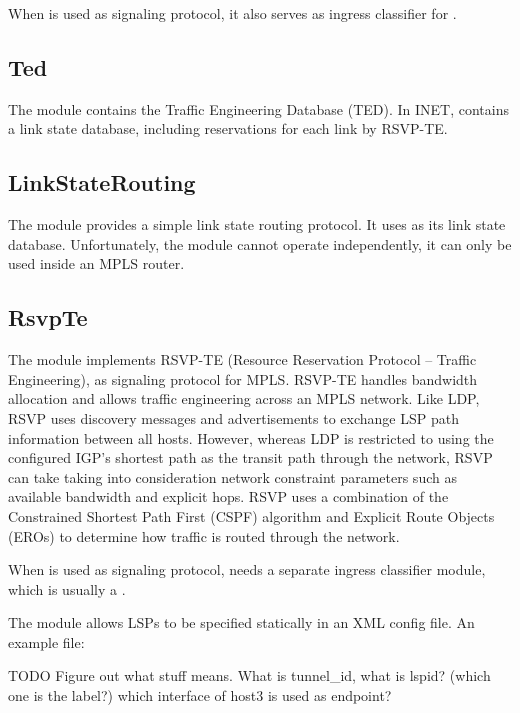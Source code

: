 When  is used as signaling protocol, it also serves as ingress
classifier for .

\subsection{Ted}
\label{sec:mpls:ted}

The  module contains the Traffic Engineering Database (TED).
In INET,  contains a link state database, including reservations
for each link by RSVP-TE.

\subsection{LinkStateRouting}
\label{sec:mpls:linkstaterouting}

The  module provides a simple link state routing
protocol. It uses  as its link state database. Unfortunately, the
 module cannot operate independently, it can only be
used inside an MPLS router.

 \subsection{RsvpTe}
\label{sec:mpls:rsvpte}

The  module implements RSVP-TE (Resource Reservation Protocol --
Traffic Engineering), as signaling protocol for MPLS. RSVP-TE handles bandwidth
allocation and allows traffic engineering across an MPLS network. Like LDP, RSVP
uses discovery messages and advertisements to exchange LSP path information
between all hosts. However, whereas LDP is restricted to using the configured
IGP's shortest path as the transit path through the network, RSVP can take
taking into consideration network constraint parameters such as available
bandwidth and explicit hops. RSVP uses a combination of the Constrained Shortest
Path First (CSPF) algorithm and Explicit Route Objects (EROs) to determine how
traffic is routed through the network.

When  is used as signaling protocol,  needs a
separate ingress classifier module, which is usually a .

The  module allows LSPs to be specified statically in an XML
config file. An example  file:

TODO Figure out what stuff means. What is tunnel\_id, what is lspid? (which one is the label?)
which interface of host3 is used as endpoint?

